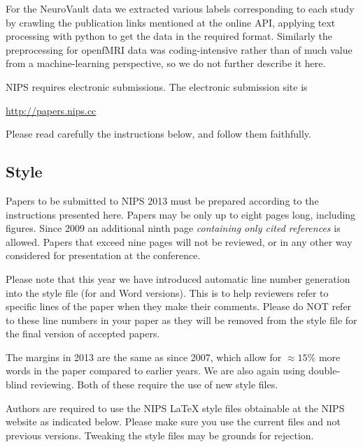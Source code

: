\documentclass{article} %
\begin{document}
For the NeuroVault data we extracted various labels corresponding to each study by crawling the publication links mentioned at the online API, applying text processing with python to get the data in the required format. Similarly the preprocessing for openfMRI data was coding-intensive rather than of much value from a machine-learning perspective, so we do not further describe it here.

NIPS requires electronic submissions.  The electronic submission site is  
\begin{center}
   \url{http://papers.nips.cc}
\end{center}

Please read carefully the
instructions below, and follow them faithfully.
\subsection{Style}

Papers to be submitted to NIPS 2013 must be prepared according to the
instructions presented here. Papers may be only up to eight pages long,
including figures. Since 2009 an additional ninth page \textit{containing only
cited references} is allowed. Papers that exceed nine pages will not be
reviewed, or in any other way considered for presentation at the conference.

Please note that this year we have introduced automatic line number generation
into the style file (for \LaTeXe and Word versions). This is to help reviewers
refer to specific lines of the paper when they make their comments. Please do
NOT refer to these line numbers in your paper as they will be removed from the
style file for the final version of accepted papers.

The margins in 2013 are the same as since 2007, which allow for $\approx 15\%$
more words in the paper compared to earlier years. We are also again using 
double-blind reviewing. Both of these require the use of new style files.

Authors are required to use the NIPS \LaTeX{} style files obtainable at the
NIPS website as indicated below. Please make sure you use the current files and
not previous versions. Tweaking the style files may be grounds for rejection.

\end{document}
